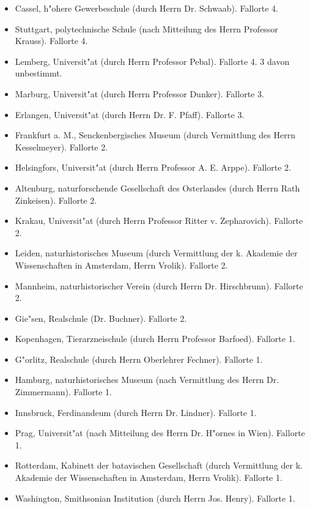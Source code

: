 \documentclass[a4paper, 11pt, oneside]{article}
\begin{document}
\begin{itemize}
    \item Cassel, h"ohere Gewerbeschule (durch Herrn Dr. Schwaab). Fallorte 4.

    \item Stuttgart, polytechnische Schule (nach Mitteilung des Herrn Professor Krauss). Fallorte 4.

    \item Lemberg, Universit"at (durch Herrn Professor Pebal). Fallorte 4. 3 davon unbestimmt.

    \item Marburg, Universit"at (durch Herrn Professor Dunker). Fallorte 3.

    \item Erlangen, Universit"at (durch Herrn Dr. F. Pfaff). Fallorte 3.

    \item Frankfurt a. M., Senckenbergisches Museum (durch Vermittlung des Herrn Kesselmeyer). Fallorte 2.

    \item Helsingfors, Universit"at (durch Herrn Professor A. E. Arppe). Fallorte 2.

    \item Altenburg, naturforschende Gesellschaft des Osterlandes (durch Herrn Rath Zinkeisen). Fallorte 2.

    \item Krakau, Universit"at (durch Herrn Professor Ritter v. Zepharovich). Fallorte 2.

    \item Leiden, naturhistorisches Museum (durch Vermittlung der k. Akademie der Wissenschaften in Amsterdam, Herrn Vrolik). Fallorte 2.

    \item Mannheim, naturhistorischer Verein (durch Herrn Dr. Hirschbrunn). Fallorte 2.

    \item Gie"sen, Realschule (Dr. Buchner). Fallorte 2.

    \item Kopenhagen, Tierarzneischule (durch Herrn Professor Barfoed). Fallorte 1.

    \item G"orlitz, Realschule (durch Herrn Oberlehrer Fechner). Fallorte 1.

    \item Hamburg, naturhistorisches Museum (nach Vermittlung des Herrn Dr. Zimmermann). Fallorte 1.

    \item Innsbruck, Ferdinandeum (durch Herrn Dr. Lindner). Fallorte 1.

    \item Prag, Universit"at (nach Mitteilung des Herrn Dr. H"ornes in Wien). Fallorte 1.

    \item Rotterdam, Kabinett der batavischen Gesellschaft (durch Vermittlung der k. Akademie der Wissenschaften in Amsterdam, Herrn Vrolik). Fallorte 1.

    \item Washington, Smithsonian Institution (durch Herrn Jos. Henry). Fallorte 1.
\end{itemize}
\clearpage
\end{document}
